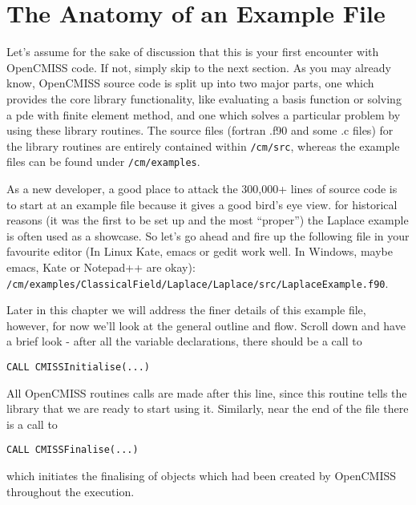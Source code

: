 \clearemptydoublepage


\section{The Anatomy of an Example File}

Let's assume for the sake of discussion that this is your first encounter with OpenCMISS
code. If not, simply skip to the next section. As you may already know, OpenCMISS source 
code is split up into two major parts, one which provides the core library functionality, 
like evaluating a basis function or solving a pde with finite element method, and one which 
solves a particular problem by using these library routines. The source files (fortran .f90 
and some .c files) for the library routines are entirely contained within \texttt{/cm/src}, 
whereas the example files can be found under \texttt{/cm/examples}. 

As a new developer, a good place to attack the 300,000+ lines of source code is to start 
at an example file because it gives a good bird's eye view. for historical reasons (it was 
the first to be set up and the most ``proper'') the Laplace example is often used as a 
showcase. So let's go ahead and fire up the following file in your favourite editor (In Linux
Kate, emacs or gedit work well. In Windows, maybe emacs, Kate or Notepad++ are okay):\\
\texttt{/cm/examples/ClassicalField/Laplace/Laplace/src/LaplaceExample.f90}.

Later in this chapter we will address the finer details of this example file, however, for
now we'll look at the general outline and flow. Scroll down and have a brief look - after
all the variable declarations, there should be a call to 
\begin{lstlisting}
CALL CMISSInitialise(...)
\end{lstlisting}
All OpenCMISS routines calls are made after this line, since this routine tells the library
that we are ready to start using it. Similarly, near the end of the file there is a call to
\begin{lstlisting}
CALL CMISSFinalise(...)
\end{lstlisting}
which initiates the finalising of objects which had been created by OpenCMISS throughout
the execution.


